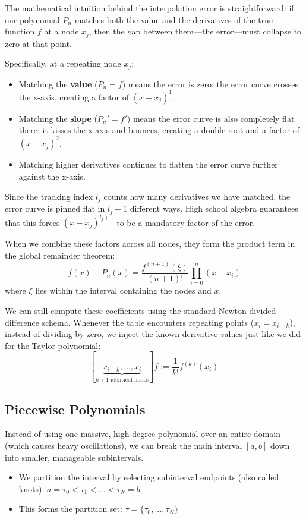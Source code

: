 \documentclass{article}
\begin{document}
The mathematical intuition behind the interpolation error is straightforward: if our polynomial $P_n$ matches both the value and the derivatives of the true function $f$ at a node $x_j$, then the gap between them—the error—must collapse to zero at that point.

Specifically, at a repeating node $x_j$:
\begin{itemize}
    \item Matching the \textbf{value} ($P_n = f$) means the error is zero: the error curve crosses the x-axis, creating a factor of $(x-x_j)^1$.
    \item Matching the \textbf{slope} ($P_n' = f'$) means the error curve is also completely flat there: it kisses the x-axis and bounces, creating a double root and a factor of $(x-x_j)^2$.
    \item Matching higher derivatives continues to flatten the error curve further against the x-axis. 
\end{itemize}

Since the tracking index $l_j$ counts how many derivatives we have matched, the error curve is pinned flat in $l_j + 1$ different ways. High school algebra guarantees that this forces $(x-x_j)^{l_j+1}$ to be a mandatory factor of the error. 

When we combine these factors across all nodes, they form the product term in the global remainder theorem:
\[f(x) - P_n(x) = \frac{f^{(n+1)}(\xi)}{(n+1)!} \prod_{i=0}^n (x-x_i)\]
where $\xi$ lies within the interval containing the nodes and $x$.

We can still compute these coefficients using the standard Newton divided difference schema. Whenever the table encounters repeating points ($x_i = x_{i-k}$), instead of dividing by zero, we inject the known derivative values just like we did for the Taylor polynomial:
\[[\underbrace{x_{i-k},\dots,x_i}_{k +1 \text{ identical nodes}}]f := \frac{1}{k!}f^{(k)}(x_i)\]


\subsection{Piecewise Polynomials}
Instead of using one massive, high-degree polynomial over an entire domain (which causes heavy oscillations), we can break the main interval $[a,b]$ down into smaller, manageable subintervals.

\begin{itemize}
  \item We partition the interval by selecting subinterval endpoints (also called knots): $a = \tau_0 < \tau_1 < \dots < \tau_N = b$
  \item This forms the partition set: $\tau = \{\tau_0, \dots, \tau_N\}$
\end{itemize}
\end{document}
